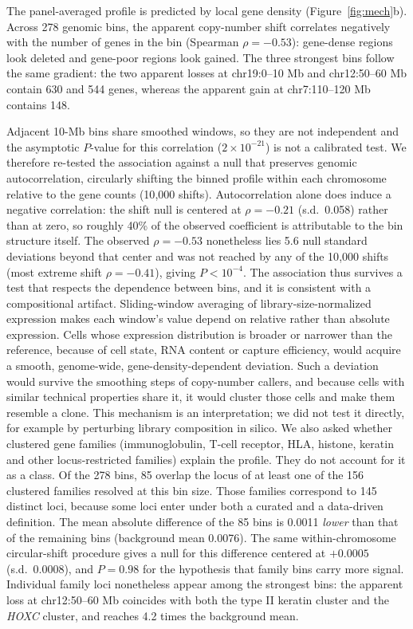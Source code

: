 \documentclass[11pt,letterpaper]{article}
\begin{document}
The panel-averaged profile is predicted by local gene density (Figure~\ref{fig:mech}b). Across 278 genomic bins, the apparent copy-number shift correlates negatively with the number of genes in the bin (Spearman $\rho = -0.53$): gene-dense regions look deleted and gene-poor regions look gained. The three strongest bins follow the same gradient: the two apparent losses at chr19:0--10 Mb and chr12:50--60 Mb contain 630 and 544 genes, whereas the apparent gain at chr7:110--120 Mb contains 148.

Adjacent 10-Mb bins share smoothed windows, so they are not independent and the asymptotic $P$-value for this correlation ($2\times10^{-21}$) is not a calibrated test. We therefore re-tested the association against a null that preserves genomic autocorrelation, circularly shifting the binned profile within each chromosome relative to the gene counts (10{,}000 shifts). Autocorrelation alone does induce a negative correlation: the shift null is centered at $\rho = -0.21$ (s.d.\ 0.058) rather than at zero, so roughly 40\% of the observed coefficient is attributable to the bin structure itself. The observed $\rho = -0.53$ nonetheless lies 5.6 null standard deviations beyond that center and was not reached by any of the 10{,}000 shifts (most extreme shift $\rho = -0.41$), giving $P < 10^{-4}$. The association thus survives a test that respects the dependence between bins, and it is consistent with a compositional artifact. Sliding-window averaging of library-size-normalized expression makes each window's value depend on relative rather than absolute expression. Cells whose expression distribution is broader or narrower than the reference, because of cell state, RNA content or capture efficiency, would acquire a smooth, genome-wide, gene-density-dependent deviation. Such a deviation would survive the smoothing steps of copy-number callers, and because cells with similar technical properties share it, it would cluster those cells and make them resemble a clone. This mechanism is an interpretation; we did not test it directly, for example by perturbing library composition in silico. We also asked whether clustered gene families (immunoglobulin, T-cell receptor, HLA, histone, keratin and other locus-restricted families) explain the profile. They do not account for it as a class. Of the 278 bins, 85 overlap the locus of at least one of the 156 clustered families resolved at this bin size. Those families correspond to 145 distinct loci, because some loci enter under both a curated and a data-driven definition. The mean absolute difference of the 85 bins is 0.0011 \emph{lower} than that of the remaining bins (background mean 0.0076). The same within-chromosome circular-shift procedure gives a null for this difference centered at $+0.0005$ (s.d.\ 0.0008), and $P = 0.98$ for the hypothesis that family bins carry more signal. Individual family loci nonetheless appear among the strongest bins: the apparent loss at chr12:50--60 Mb coincides with both the type II keratin cluster and the \textit{HOXC} cluster, and reaches 4.2 times the background mean.
\end{document}
